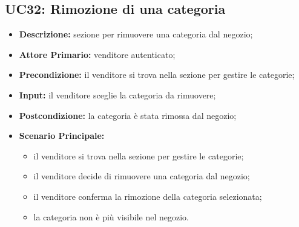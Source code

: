 
\subsection{UC32: Rimozione di una categoria}
\label{sec:UC32}
\begin{itemize}
    \item \textbf{Descrizione:} sezione per rimuovere una categoria dal negozio;
    \item \textbf{Attore Primario:} venditore autenticato;
    \item \textbf{Precondizione:} il venditore si trova nella sezione per gestire le categorie;
    \item \textbf{Input:} il venditore sceglie la categoria da rimuovere;
    \item \textbf{Postcondizione:} la categoria è stata rimossa dal negozio;
    \item \textbf{Scenario Principale:}
          \begin{itemize}
              \item il venditore si trova nella sezione per gestire le categorie;
              \item il venditore decide di rimuovere una categoria dal negozio;
              \item il venditore conferma la rimozione della categoria selezionata;
              \item la categoria non è più visibile nel negozio.
          \end{itemize}
\end{itemize}

